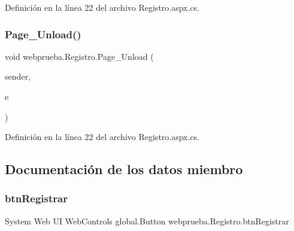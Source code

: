 Definición en la línea 22 del archivo Registro.\+aspx.\+cs.


\begin{DoxyCode}{0}

\end{DoxyCode}
\mbox{\label{classwebprueba_1_1_registro_a55b248cd28e6482085487d8a1d7cee0e}} 
\subsubsection{\texorpdfstring{Page\_Unload()}{Page\_Unload()}\hspace{0.1cm}{\footnotesize\ttfamily [2/2]}}
{\footnotesize\ttfamily void webprueba.\+Registro.\+Page\+\_\+\+Unload (\begin{DoxyParamCaption}\item[{object}]{sender,  }\item[{Event\+Args}]{e }\end{DoxyParamCaption})\hspace{0.3cm}{\ttfamily [protected]}}



Definición en la línea 22 del archivo Registro.\+aspx.\+cs.


\begin{DoxyCode}{0}

\end{DoxyCode}


\subsection{Documentación de los datos miembro}
\mbox{\label{classwebprueba_1_1_registro_a01b1342a8e6d76fedf0cc770cf7b4c12}} 
\subsubsection{\texorpdfstring{btnRegistrar}{btnRegistrar}}
{\footnotesize\ttfamily System Web UI Web\+Controls global.\+Button webprueba.\+Registro.\+btn\+Registrar\hspace{0.3cm}{\ttfamily [protected]}}



